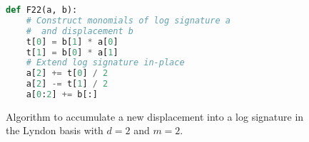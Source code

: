 \begin{comment}
\def\GETS{\,\mathrel{\texttt{:=}}\,}
\def\INC#1{#1\,\mathrel{\texttt{+=}}\,}
\def\DEC#1{#1\,\mathrel{\texttt{-=}}\,}
\def\DEC#1{#1\,\mathrel{\texttt{+=}}\,-}
\begin{algorithmic}
		\setstretch{1.2}
\Procedure{f22}{log signature $a$ to be modified in place, new displacement $b$}%
	\State \verb|t[0] = b[1]a[0]|
	\State $t[0]\GETS b[1]a[0]$
	\State $t[1]\GETS b[0]a[1]$
	\State $\INC{a[2]}\frac12t[0]$
	\State $\DEC{a[2]}\frac12t[1]$
	\State $\INC{a[2]}b[2]$
	\State $\INC{a[1]}b[1]$
	\State $\INC{a[0]}b[0]$
\EndProcedure
\end{algorithmic}
\end{comment}

\newsavebox{\Lst}
\begin{figure}[H]
\iffalse
\begin{lrbox}{\Lst}
\begin{lstlisting}[language=C]
void F22(log_signature& a, new_displacement& b) {
    t[0]  = b[1]*a[0]; // Construct monomials
    t[0]  = b[1]*a[0];
    t[1]  = b[0]*a[1];
    a[2] += t[0]/2;    // Extend log signature in-place
    a[2] -= t[1]/2;
    a[2] += b[2];
    a[1] += b[1];
    a[0] += b[0];
}
\end{lstlisting}
\end{lrbox}
\fi

\begin{lrbox}{\Lst}
\begin{lstlisting}[language=Python]
def F22(a, b):
    # Construct monomials of log signature a
    #  and displacement b
    t[0] = b[1] * a[0]
    t[1] = b[0] * a[1]
    # Extend log signature in-place
    a[2] += t[0] / 2    
    a[2] -= t[1] / 2
    a[0:2] += b[:]
\end{lstlisting}
\end{lrbox}
\begin{center}
\fbox{\usebox{\Lst}}
\end{center}
\caption[Pseudocode to concatenate a displacement onto a level 2 log signature.]{\label{fig:F22}Algorithm to accumulate a new displacement into a log signature in the Lyndon basis with $d=2$ and $m=2$.}
\end{figure}
